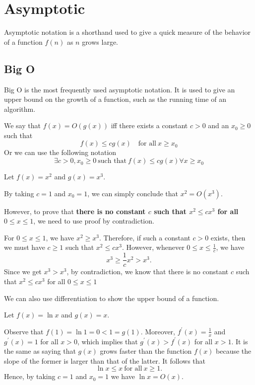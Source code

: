 \chapter{Asymptotic}

Asymptotic notation is a shorthand used to give a quick measure of the behavior of a function \(f(n)\) as \(n\) grows large. 

\section{Big O}
Big O is the most frequently used asymptotic notation. It is used to give an upper bound on the growth of a function, such as the running time of an algorithm.

\begin{definition}
    We say that \(f(x) = O(g(x))\) iff there exists a constant \(c > 0\) and an \(x_0 \geq 0\) such that
    \[
    f(x) \leq cg(x)\quad\text{for all}\ x \geq x_0
    \]
    Or we can use the following notation
    \[
        \exists c > 0, x_0 \geq 0\ \text{such that}\ f(x) \leq cg(x) \forall x \geq x_0
    \]
\end{definition}

\begin{eg}
    Let \(f(x) = x^2\) and \(g(x) = x^3\). 

    By taking \(c = 1\) and \(x_0 = 1\), we can simply conclude that \(x^2 = O(x^3)\). 
    
    However, to prove that \textbf{there is no constant \(c\) such that \(x^2 \leq cx^3\) for all \(0 \leq x \leq 1\)}, we need to use proof by contradiction. 
    
    For \(0 \leq x \leq 1\), we have \(x^2 \geq x^3\). Therefore, if such a constant \(c > 0\) exists, then we must have \(c \geq 1\) such that \(x^2 \leq cx^3\). However, whenever \(0 \leq x \leq \frac{1}{c}\), we have
    \[
        x^3 \geq \dfrac{1}{c}x^2 > x^3.
    \]
    Since we get \(x^3 > x^3\), by contradiction, we know that there is no constant \(c\) such that \(x^2 \leq cx^3\) for all \(0 \leq x \leq 1\)
\end{eg}

We can also use differentiation to show the upper bound of a function.
\begin{eg}
Let \(f(x) = \ln x\) and \(g(x) = x\). 

Observe that \(f(1) = \ln 1 = 0 < 1 = g(1)\).  Moreover, \(f^{\prime} (x) = \frac{1}{x}\) and \(g^{\prime} (x) = 1\) for all \(x > 0\), which implies that \(g^{\prime}(x) > f^{\prime}(x)\) for all \(x > 1\). It is the same as saying that \(g(x)\) grows faster than the function \(f(x)\) because the slope of the former is larger than that of the latter. It follows that
\[
    \ln x \leq x\ \text{for all}\ x \geq 1.
\] 
Hence, by taking \(c = 1\) and \(x_0 = 1\) we have \(\ln x = O(x).\) 
\end{eg}

